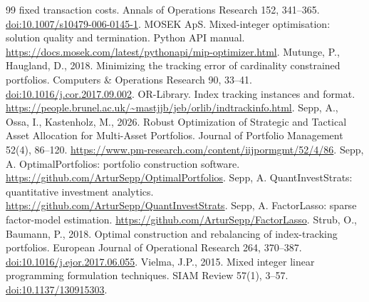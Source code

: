 \documentclass[preprint,12pt,authoryear]{elsarticle}
\begin{document}
\begin{thebibliography}{99}
fixed transaction costs. Annals of Operations Research 152, 341--365.
\href{https://doi.org/10.1007/s10479-006-0145-1}{doi:10.1007/s10479-006-0145-1}.
MOSEK ApS. Mixed-integer optimisation: solution quality and termination.
Python API manual. \url{https://docs.mosek.com/latest/pythonapi/mip-optimizer.html}.
Mutunge, P., Haugland, D., 2018. Minimizing the tracking error of cardinality
constrained portfolios. Computers \& Operations Research 90, 33--41.
\href{https://doi.org/10.1016/j.cor.2017.09.002}{doi:10.1016/j.cor.2017.09.002}.
OR-Library. Index tracking instances and format.
\url{https://people.brunel.ac.uk/~mastjjb/jeb/orlib/indtrackinfo.html}.
Sepp, A., Ossa, I., Kastenholz, M., 2026. Robust Optimization of Strategic and
Tactical Asset Allocation for Multi-Asset Portfolios. Journal of Portfolio
Management 52(4), 86--120. \url{https://www.pm-research.com/content/iijpormgmt/52/4/86}.
Sepp, A. OptimalPortfolios: portfolio construction software.
\url{https://github.com/ArturSepp/OptimalPortfolios}.
Sepp, A. QuantInvestStrats: quantitative investment analytics.
\url{https://github.com/ArturSepp/QuantInvestStrats}.
Sepp, A. FactorLasso: sparse factor-model estimation.
\url{https://github.com/ArturSepp/FactorLasso}.
Strub, O., Baumann, P., 2018. Optimal construction and rebalancing of index-tracking
portfolios. European Journal of Operational Research 264, 370--387.
\href{https://doi.org/10.1016/j.ejor.2017.06.055}{doi:10.1016/j.ejor.2017.06.055}.
Vielma, J.P., 2015. Mixed integer linear programming formulation techniques.
SIAM Review 57(1), 3--57.
\href{https://doi.org/10.1137/130915303}{doi:10.1137/130915303}.
\end{thebibliography}
\end{document}
